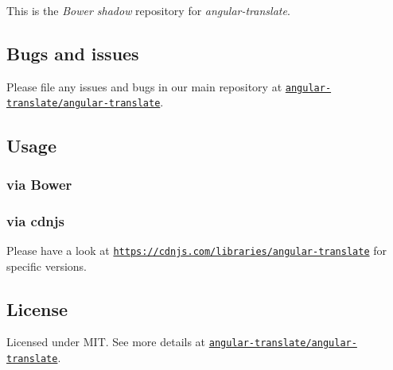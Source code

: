 This is the {\itshape Bower shadow} repository for {\itshape angular-\/translate}.

\subsection*{Bugs and issues}

Please file any issues and bugs in our main repository at \href{https://github.com/angular-translate/angular-translate/issues}{\tt angular-\/translate/angular-\/translate}.

\subsection*{Usage}

\subsubsection*{via Bower}




\subsubsection*{via cdnjs}

Please have a look at \href{https://cdnjs.com/libraries/angular-translate}{\tt https\+://cdnjs.\+com/libraries/angular-\/translate} for specific versions.

\subsection*{License}

Licensed under M\+IT. See more details at \href{https://github.com/angular-translate/angular-translate}{\tt angular-\/translate/angular-\/translate}. 